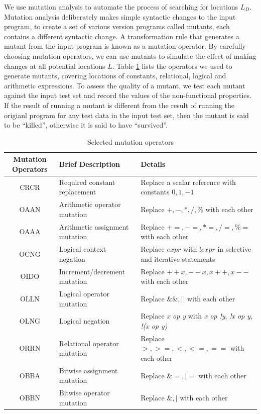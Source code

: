 We use mutation analysis to automate the process of searching for locations $L_D$. Mutation analysis deliberately makes simple syntactic changes to the input program, to create a set of various version programs called mutants, each contains a different syntactic change. A transformation rule that generates a mutant from the input program is known as a mutation operator. By carefully choosing mutation operators, we can use mutants to simulate the effect of making changes at all potential locations $L$. Table \ref{tab:cmop} lists the operators we used to generate mutants, covering locations of constants, relational, logical and arithmetic expressions. 
To assess the quality of a mutant, we test each mutant against the input test set and record the values of the non-functional properties. If the result of running a mutant is different from the result of running the origianl program for any test data in the input test set, then the mutant is said to be ``killed'', otherwise it is said to have ``survived''. 

\begin{table} [htbp]
\caption{Selected mutation operators}
\label{tab:cmop} 
\begin{center}
\begin{tabular}{ | c | l | l |}
  \hline
  Mutation Operators & Brief Description & Details \\ 
\hline
  CRCR & Required constant replacement & Replace a scalar reference with constants $0, 1, -1$ \\
  OAAN & Arithmetic operator mutation & Replace $+, -, *, /, \%$ with each other \\
  OAAA & Arithmetic assignment mutation & Replace $+=, -=, *=, /=, \%=$ with each other \\
  OCNG & Logical context negation & Replace $expr$ with $!expr$ in selective and iterative statements\\
  OIDO & Increment/decrement mutation  & Replace $++x, --x, x++, x--$ with each other \\
  OLLN & Logical operator mutation  & Replace $\&\&, ||$ with each other \\ 
  OLNG & Logical negation & Replace \emph{x op y} with \emph{x op !y}, \emph{!x op y}, \emph{!(x op y)}\\
  ORRN & Relational operator mutation & Replace $>, >=, <, <=, ==$ with each other \\
  OBBA & Bitwise assignment mutation & Replace $\&=, |=$ with each other \\
  OBBN & Bitwise operator mutation & Replace $\&, |$ with each other \\
\hline
\end{tabular} 
\end{center} 
\end{table} 

